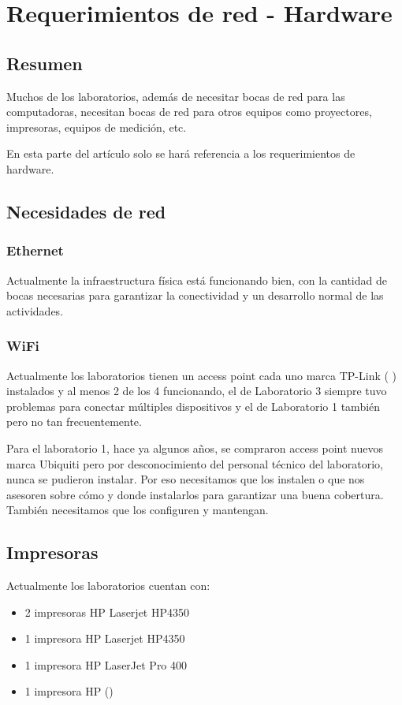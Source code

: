 \chapter[Requerimientos de red - Hardware]{Requerimientos de red - Hardware}
\label{cp:requerimientos-hardware}

\section*{Resumen}
Muchos de los laboratorios, además de necesitar bocas de red para las computadoras, necesitan bocas de red para otros equipos como proyectores, impresoras, equipos de medición, etc.

En esta parte del artículo solo se hará referencia a los requerimientos de hardware. 

\section{Necesidades de red}
\subsection{Ethernet}
Actualmente la infraestructura física está funcionando bien, con la cantidad de bocas necesarias para garantizar la conectividad y un desarrollo normal de las actividades.

\subsection{WiFi}
Actualmente los laboratorios tienen un access point cada uno marca TP-Link ( ) instalados y al menos 2 de los 4 funcionando, el de Laboratorio 3 siempre tuvo problemas para conectar múltiples dispositivos y el de Laboratorio 1 también pero no tan frecuentemente.

Para el laboratorio 1, hace ya algunos años, se compraron access point nuevos marca Ubiquiti pero por desconocimiento del personal técnico del laboratorio, nunca se pudieron instalar. Por eso necesitamos que los instalen o que nos asesoren sobre cómo y donde instalarlos para garantizar una buena cobertura. También necesitamos que los configuren y mantengan.

\section{Impresoras}
Actualmente los laboratorios cuentan con:
\begin{itemize}
    \item 2 impresoras HP Laserjet HP4350
    \item 1 impresora HP Laserjet HP4350
    \item 1 impresora HP LaserJet Pro 400
    \item 1 impresora HP ()
\end{itemize}

